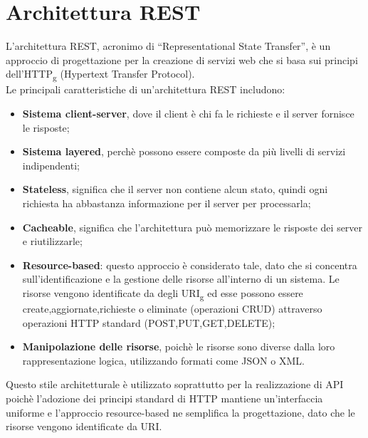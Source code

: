 \section{Architettura REST}
L’architettura REST, acronimo di “Representational State Transfer”, è un approccio di progettazione per la creazione di servizi web che si basa sui principi dell’HTTP\textsubscript{g} (Hypertext Transfer Protocol).\\
Le principali caratteristiche di un’architettura REST includono:
\begin{itemize}
\item \textbf{Sistema client-server}, dove il client è chi fa le richieste e il server fornisce le risposte;
\item \textbf{Sistema layered}, perchè possono essere composte da più livelli di servizi indipendenti;
\item \textbf{Stateless}, significa che il server non contiene alcun stato, quindi ogni richiesta ha abbastanza informazione per il server per processarla;
\item \textbf{Cacheable}, significa che l’architettura può memorizzare le risposte dei server e riutilizzarle;
\item \textbf{Resource-based}: questo approccio è considerato tale, dato che si concentra sull’identificazione e la gestione delle risorse all’interno di un sistema. Le risorse vengono identificate da degli URI\textsubscript{g} ed esse possono essere create,aggiornate,richieste o eliminate (operazioni CRUD) attraverso operazioni HTTP standard (POST,PUT,GET,DELETE);
\item \textbf{Manipolazione delle risorse}, poichè le risorse sono diverse dalla loro rappresentazione logica, utilizzando formati come JSON o XML.
\end{itemize}
Questo stile architetturale è utilizzato soprattutto per la realizzazione di API poichè l'adozione dei principi standard di HTTP mantiene un'interfaccia uniforme e l'approccio resource-based ne semplifica la progettazione, dato che le risorse vengono identificate da URI.

